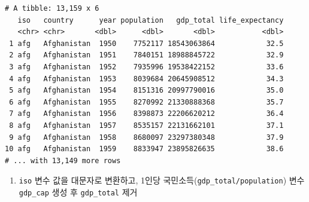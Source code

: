 \documentclass[
  11pt,
]{krantz}
\newenvironment{Shaded}{\begin{snugshade}}{\end{snugshade}}
\newcommand{\DataTypeTok}[1]{\textcolor[rgb]{0.27,0.27,0.27}{#1}}
\newcommand{\DecValTok}[1]{\textcolor[rgb]{0.06,0.06,0.06}{#1}}
\newcommand{\KeywordTok}[1]{\textcolor[rgb]{0.27,0.27,0.27}{\textbf{#1}}}
\newcommand{\NormalTok}[1]{#1}
\newcommand{\OperatorTok}[1]{\textcolor[rgb]{0.43,0.43,0.43}{\textbf{#1}}}
\newcommand{\StringTok}[1]{\textcolor[rgb]{0.5,0.5,0.5}{#1}}
\providecommand{\tightlist}{%
  \setlength{\itemsep}{0pt}\setlength{\parskip}{0pt}}
\begin{document}
\footnotesize

\begin{Shaded}
\end{Shaded}

\begin{verbatim}
# A tibble: 13,159 x 6
   iso   country      year population   gdp_total life_expectancy
   <chr> <chr>       <dbl>      <dbl>       <dbl>           <dbl>
 1 afg   Afghanistan  1950    7752117 18543063864            32.5
 2 afg   Afghanistan  1951    7840151 18988845722            32.9
 3 afg   Afghanistan  1952    7935996 19538422152            33.6
 4 afg   Afghanistan  1953    8039684 20645908512            34.3
 5 afg   Afghanistan  1954    8151316 20997790016            35.0
 6 afg   Afghanistan  1955    8270992 21330888368            35.7
 7 afg   Afghanistan  1956    8398873 22206620212            36.4
 8 afg   Afghanistan  1957    8535157 22131662101            37.1
 9 afg   Afghanistan  1958    8680097 23297380348            37.9
10 afg   Afghanistan  1959    8833947 23895826635            38.6
# ... with 13,149 more rows
\end{verbatim}

\normalsize

\begin{enumerate}
\def\labelenumi{\arabic{enumi}.}
\setcounter{enumi}{3}
\tightlist
\item
  \texttt{iso} 변수 값을 대문자로 변환하고, 1인당 국민소득(\texttt{gdp\_total/population}) 변수 \texttt{gdp\_cap} 생성 후 \texttt{gdp\_total} 제거
\end{enumerate}

\footnotesize

\begin{Shaded}
\end{Shaded}
\end{document}
